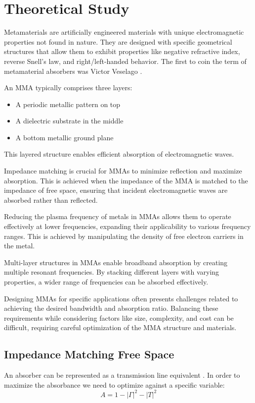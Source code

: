 \section{\textsf{Theoretical Study}}
    Metamaterials are artificially engineered materials with unique electromagnetic properties
    not found in nature. They are designed with specific geometrical structures that allow them
    to exhibit properties like negative refractive index, reverse Snell's law, and right/left-handed
    behavior. The first to coin the term of metamaterial absorbers was Victor Veselago \cite{veselago_left_2006}.
    
    An MMA typically comprises three layers: 
    \begin{itemize}
        \item A periodic metallic pattern on top
        \item A dielectric substrate in the middle
        \item A bottom metallic ground plane
    \end{itemize}
    This layered structure enables efficient absorption of electromagnetic waves.

    Impedance matching is crucial for MMAs to minimize reflection and maximize absorption. 
    This is achieved when the impedance of the MMA is matched to the impedance of free space,
    ensuring that incident electromagnetic waves are absorbed rather than reflected.
    
    Reducing the plasma frequency of metals in MMAs allows them to operate effectively at 
    lower frequencies, expanding their applicability to various frequency ranges. 
    This is achieved by manipulating the density of free electron carriers in the metal.

    Multi-layer structures in MMAs enable broadband absorption by creating multiple resonant
    frequencies. By stacking different layers with varying properties, a wider range of 
    frequencies can be absorbed effectively.


    Designing MMAs for specific applications often presents challenges related to achieving 
    the desired bandwidth and absorption ratio. Balancing these requirements while considering
    factors like size, complexity, and cost can be difficult, requiring careful optimization
    of the MMA structure and materials.

    \subsection{\textsf{Impedance Matching Free Space}}
        An absorber can be represented as a transmission line equivalent
        \cite{biswas_ultra-wideband_2022}. In order to maximize the absorbance we need to optimize
        against a specific variable:
        \begin{equation}
            A = 1 - |\Gamma|^2 - |T|^2
            \label{eq:A}
        \end{equation}

